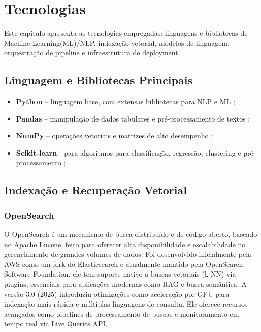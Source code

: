 \chapter{Tecnologias}

\label{chap:tecnologias}
Este capítulo apresenta as tecnologias empregadas: linguagens e bibliotecas de Machine Learning(ML)/NLP, indexação vetorial, modelos de linguagem, orquestração de pipeline e infraestrutura de deployment.  
\section{Linguagem e Bibliotecas Principais}
\begin{itemize}[label=\textbullet]

\item \textbf{Python} – linguagem base, com extensas bibliotecas para NLP e ML  \cite{python2024reference};
\item \textbf{Pandas} – manipulação de dados tabulares e pré-processamento de textos  \cite{pandas2024};
\item \textbf{NumPy} – operações vetoriais e matrizes de alto desempenho \cite{numpy2025};
\item \textbf{Scikit-learn} - para algoritmos para classificação, regressão, clustering e pré-processamento \cite{scikit-learn};



\end{itemize}

\section{Indexação e Recuperação Vetorial}
\subsection{OpenSearch}
O OpenSearch é um mecanismo de busca distribuído e de código aberto, baseado no Apache Lucene, feito para oferecer alta disponibilidade e escalabilidade no gerenciamento de grandes volumes de dados. Foi desenvolvido inicialmente pela AWS como um fork do Elasticsearch e atualmente mantido pela OpenSearch Software Foundation, ele tem suporte nativo a buscas vetoriais (k-NN) via plugins, essenciais para aplicações modernas como RAG e busca semântica. 
A versão 3.0 (2025) introduziu otimizações como aceleração por GPU para indexação mais rápida e múltiplas linguagens de consulta. Ele oferece recursos avançados como pipelines de processamento de buscas e monitoramento em tempo real via Live Queries API. \cite{taipalus2024vector,opensearch2025}.


